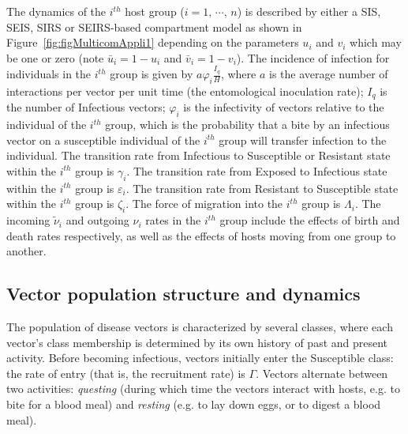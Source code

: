 \documentclass[a4paper]{article}
\newcommand{\miVar}{\varphi_i}
\begin{document}
The dynamics of the $i^{th}$ host group ($i=1,\,\cdots,\,n$) is described by either a SIS, SEIS, SIRS or SEIRS-based compartment model  as shown in  Figure~\ref{fig:figMulticomAppli1} depending on the parameters $u_i$ and $v_i$ which may be  one or zero (note $\bar{u}_i = 1-u_i$ and $\bar{v}_i = 1-v_i$). The incidence of infection for  individuals in the $i^{th}$ group  is given by $a\varphi_i \frac{I_q}{H}$, where $a$ is the average number of interactions per vector per unit time (the entomological  inoculation rate); $I_q$ is the number of Infectious vectors; $\miVar$ is the infectivity of vectors relative to the individual of the $i^{th}$ group, which is the probability that a bite by an infectious vector on a susceptible individual of the $i^{th}$ group will transfer  infection to the individual. The transition rate from Infectious to Susceptible or Resistant state within the $i^{th}$  group is $\gamma_i$. The transition rate from Exposed  to Infectious state within the $i^{th}$  group is $\varepsilon_i$. The transition rate from Resistant to Susceptible state within the $i^{th}$  group is $\zeta_i$. The force of migration into the $i^{th}$  group is $\Lambda_i$. The incoming  $\widetilde \nu_i$ and outgoing $\nu_i$  rates in the $i^{th}$  group   include the effects of birth and death rates respectively, as well as the effects of hosts moving from one group to another. 

\subsection{Vector population structure and dynamics}\label{subsec.Assumption}

\noindent
The population of disease vectors is characterized by several classes, where each vector's class membership is determined by its own history of past and present activity. Before becoming infectious, vectors initially enter the Susceptible class: the rate of entry (that is, the recruitment rate) is $\Gamma$. Vectors alternate between two activities: {\it questing} (during which time the vectors interact with hosts, e.g. to bite for a blood meal) and {\it resting} (e.g. to lay down eggs, or to digest a blood meal). %
   
\end{document}

